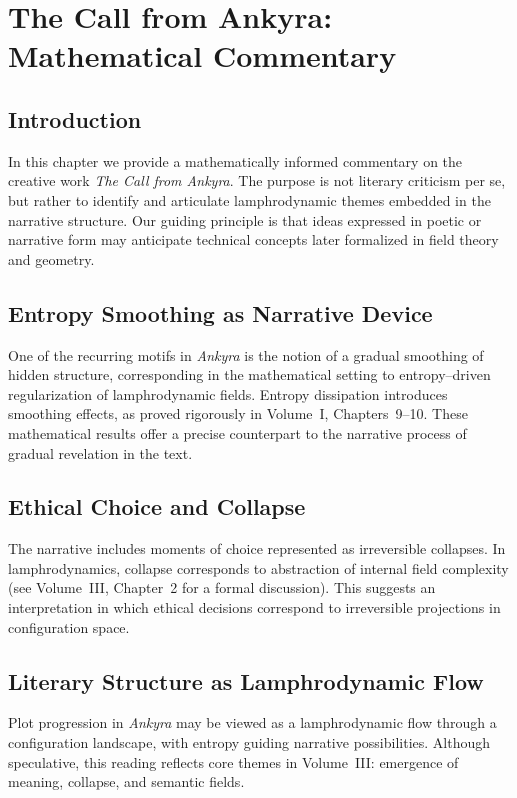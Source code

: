 
\chapter{The Call from Ankyra: Mathematical Commentary}
\label{chap:call-from-ankyra}

\section{Introduction}

In this chapter we provide a mathematically informed commentary on the
creative work \emph{The Call from Ankyra}. The purpose is not literary
criticism per se, but rather to identify and articulate lamphrodynamic
themes embedded in the narrative structure. Our guiding principle is that
ideas expressed in poetic or narrative form may anticipate technical
concepts later formalized in field theory and geometry.

\section{Entropy Smoothing as Narrative Device}

One of the recurring motifs in \emph{Ankyra} is the notion of a gradual
smoothing of hidden structure, corresponding in the mathematical setting
to entropy--driven regularization of lamphrodynamic fields. Entropy
dissipation introduces smoothing effects, as proved rigorously in
Volume~I, Chapters~9--10. These mathematical results offer a precise
counterpart to the narrative process of gradual revelation in the text.

\section{Ethical Choice and Collapse}

The narrative includes moments of choice represented as irreversible
collapses. In lamphrodynamics, collapse corresponds to abstraction of
internal field complexity (see Volume~III, Chapter~2 for a formal
discussion). This suggests an interpretation in which ethical decisions
correspond to irreversible projections in configuration space.

\section{Literary Structure as Lamphrodynamic Flow}

Plot progression in \emph{Ankyra} may be viewed as a lamphrodynamic flow
through a configuration landscape, with entropy guiding narrative
possibilities. Although speculative, this reading reflects core themes in
Volume~III: emergence of meaning, collapse, and semantic fields.


\newpage
